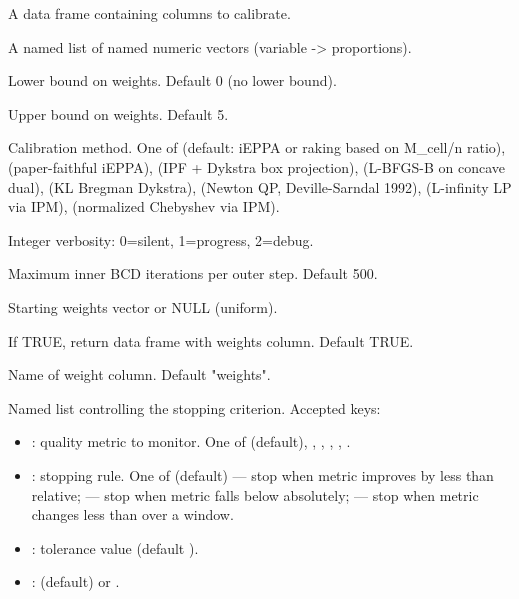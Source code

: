 \documentclass[a4paper]{book}
\begin{document}
\begin{Arguments}
\begin{ldescription}
\item[\code{data}] A data frame containing columns to calibrate.

\item[\code{target}] A named list of named numeric vectors (variable -> proportions).

\item[\code{min\_weight}] Lower bound on weights. Default 0 (no lower bound).

\item[\code{max\_weight}] Upper bound on weights. Default 5.

\item[\code{method}] Calibration method. One of  (default: iEPPA or
raking based on M\_cell/n ratio),  (paper-faithful iEPPA),
 (IPF + Dykstra box projection), 
(L-BFGS-B on concave dual),  (KL Bregman Dykstra),
 (Newton QP, Deville-Sarndal 1992), 
(L-infinity LP via IPM),  (normalized Chebyshev via IPM).

\item[\code{verbose}] Integer verbosity: 0=silent, 1=progress, 2=debug.

\item[\code{max\_iterations}] Maximum inner BCD iterations per outer step. Default 500.

\item[\code{start\_weights}] Starting weights vector or NULL (uniform).

\item[\code{attach\_weights}] If TRUE, return data frame with weights column. Default TRUE.

\item[\code{weight\_column}] Name of weight column. Default "weights".

\item[\code{convergence}] Named list controlling the stopping criterion. Accepted keys:
\begin{itemize}

\item{} : quality metric to monitor. One of 
(default), , , ,
, .
\item{} : stopping rule. One of  (default) —
stop when metric improves by less than  relative;  —
stop when metric falls below  absolutely;  —
stop when metric changes less than  over a window.
\item{} : tolerance value (default ).
\item{} :  (default) or .


\end{itemize}
\end{ldescription}
\end{Arguments}
\end{document}
